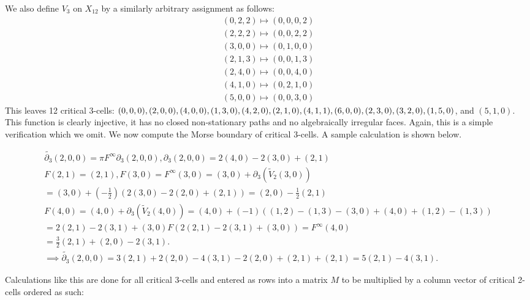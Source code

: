 \documentclass{amsart}
\begin{document}
We also define $V_{3}$ on $X_{12}$ by a similarly arbitrary assignment as follows:
\begin{gather*}
(0,2,2) \mapsto (0,0,0,2)\\
(2,2,2) \mapsto (0,0,2,2)\\
(3,0,0) \mapsto (0,1,0,0)\\
(2,1,3) \mapsto (0,0,1,3)\\
(2,4,0) \mapsto (0,0,4,0)\\
(4,1,0) \mapsto (0,2,1,0)\\
(5,0,0) \mapsto (0,0,3,0)
\end{gather*}
This leaves 12 critical 3-cells: $(0,0,0), (2,0,0), (4,0,0), (1,3,0), (4,2,0), (2,1,0),\\ (4,1,1), (6,0,0), (2,3,0), (3,2,0), (1,5,0)$, and $(5,1,0)$. This function is clearly injective, it has no closed non-stationary paths and no algebraically irregular faces. Again, this is a simple verification which we omit. We now compute the Morse boundary of critical 3-cells. A sample calculation is shown below.

\begin{gather*}
\widetilde{\partial_{3}}(2,0,0) = \pi F^{\infty} \partial_{3}(2,0,0), \partial_{3}(2,0,0) = 2(4,0) - 2(3,0) + (2,1)\\
F(2,1) = (2,1), F(3,0) = F^{\infty}(3,0) = (3,0) + \partial_{3}(\widetilde{V}_{2}(3,0))\\ 
= (3,0) + (- \frac{1}{2})(2(3,0) - 2(2,0) + (2,1)) = (2,0) -\frac{1}{2}(2,1)\\
F(4,0) = (4,0) + \partial_{3}(\widetilde{V}_2(4,0)) = (4,0) + (-1)((1,2) - (1,3) - (3,0) + (4,0) + (1,2) - (1,3))\\
= 2(2,1) - 2(3,1) + (3,0)
F(2(2,1) - 2(3,1) + (3,0)) = F^{\infty}(4,0)\\
= \frac{3}{2}(2,1) + (2,0) - 2(3,1).\\
\implies \widetilde{\partial_{3}}(2,0,0) = 3(2,1) + 2(2,0) - 4(3,1) -2(2,0) + (2,1) + (2,1) = 5(2,1) -4(3,1).
\end{gather*}

Calculations like this are done for all critical 3-cells and entered as rows into a matrix $M$ to be multiplied by a column vector of critical 2-cells ordered as such:

\bigskip
\end{document}
